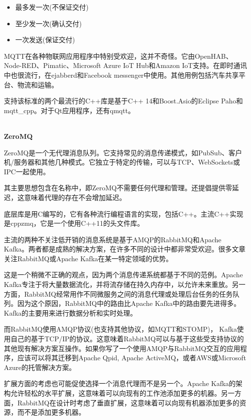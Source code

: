 \begin{itemize}
\item 
最多发一次(不保证交付)

\item 
至少发一次(确认交付)

\item 
一次发送(保证交付)
\end{itemize}

MQTT在各种物联网应用程序中特别受欢迎，这并不奇怪。它由OpenHAB、Node-RED、Pimatic、Microsoft Azure IoT Hub和Amazon IoT支持。在即时通讯中也很流行，在ejabberd和Facebook messenger中使用。其他用例包括汽车共享平台、物流和运输。

支持该标准的两个最流行的C++库是基于C++ 14和Boost.Asio的Eclipse Paho和mqtt\_cpp。对于Qt应用程序，还有qmqtt。

\hspace*{\fill} \\ %
\noindent
\textbf{ZeroMQ}

ZeroMQ是一个无代理消息队列。它支持常见的消息传递模式，如PubSub、客户机/服务器和其他几种模式。它独立于特定的传输，可以与TCP、WebSockets或IPC一起使用。

其主要思想包含在名称中，即ZeroMQ不需要任何代理和管理。还提倡提供零延迟，这意味着代理的存在不会增加延迟。

底层库是用C编写的，它有各种流行编程语言的实现，包括C++。主流C++实现是cppzmq，它是一个使用C++11的头文件库。


主流的两种不关注低开销的消息系统是基于AMQP的RabbitMQ和Apache Kafka。两者都是成熟的解决方案，在许多不同的设计中都非常受欢迎。很多文章关注RabbitMQ或Apache Kafka在某一特定领域的优势。

这是一个稍微不正确的观点，因为两个消息传递系统都基于不同的范例。Apache Kafka专注于将大量数据流化，并将流存储在持久内存中，以允许未来重放。另一方面，RabbitMQ经常用作不同微服务之间的消息代理或处理后台任务的任务队列。因为这个原因，RabbitMQ中的路由比Apache Kafka中的路由要先进得多。Kafka的主要用来进行数据分析和实时处理。

而RabbitMQ使用AMQP协议(也支持其他协议，如MQTT和STOMP)， Kafka使用自己的基于TCP/IP的协议。这意味着RabbitMQ可以与基于这些受支持协议的其他现有解决方案互操作。如果你写了一个使用AMQP与RabbitMQ交互的应用程序，应该可以将其迁移到Apache Qpid, Apache ActiveMQ，或者AWS或Microsoft Azure的托管解决方案。

扩展方面的考虑也可能促使选择一个消息代理而不是另一个。Apache Kafka的架构允许轻松的水平扩展，这意味着可以向现有的工作池添加更多的机器。另一方面，RabbitMQ在设计时考虑了垂直扩展，这意味着可以向现有机器添加更多的资源，而不是添加更多机器。














